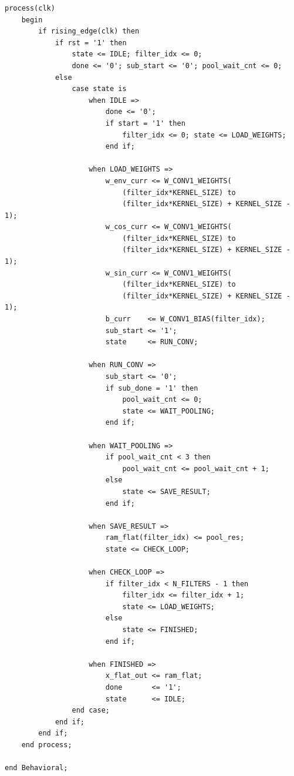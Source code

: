 \documentclass[a4paper,12pt]{article}
\begin{document}
\begin{lstlisting}[style=vhdlstyle,
    caption={C\'odigo VHDL do \texttt{Conv\_Layer\_Serial}.},
    label={lst:conv_serial}]
    process(clk)
    begin
        if rising_edge(clk) then
            if rst = '1' then
                state <= IDLE; filter_idx <= 0;
                done <= '0'; sub_start <= '0'; pool_wait_cnt <= 0;
            else
                case state is
                    when IDLE =>
                        done <= '0';
                        if start = '1' then
                            filter_idx <= 0; state <= LOAD_WEIGHTS;
                        end if;

                    when LOAD_WEIGHTS =>
                        w_env_curr <= W_CONV1_WEIGHTS(
                            (filter_idx*KERNEL_SIZE) to
                            (filter_idx*KERNEL_SIZE) + KERNEL_SIZE - 1);
                        w_cos_curr <= W_CONV1_WEIGHTS(
                            (filter_idx*KERNEL_SIZE) to
                            (filter_idx*KERNEL_SIZE) + KERNEL_SIZE - 1);
                        w_sin_curr <= W_CONV1_WEIGHTS(
                            (filter_idx*KERNEL_SIZE) to
                            (filter_idx*KERNEL_SIZE) + KERNEL_SIZE - 1);
                        b_curr    <= W_CONV1_BIAS(filter_idx);
                        sub_start <= '1';
                        state     <= RUN_CONV;

                    when RUN_CONV =>
                        sub_start <= '0';
                        if sub_done = '1' then
                            pool_wait_cnt <= 0;
                            state <= WAIT_POOLING;
                        end if;

                    when WAIT_POOLING =>
                        if pool_wait_cnt < 3 then
                            pool_wait_cnt <= pool_wait_cnt + 1;
                        else
                            state <= SAVE_RESULT;
                        end if;

                    when SAVE_RESULT =>
                        ram_flat(filter_idx) <= pool_res;
                        state <= CHECK_LOOP;

                    when CHECK_LOOP =>
                        if filter_idx < N_FILTERS - 1 then
                            filter_idx <= filter_idx + 1;
                            state <= LOAD_WEIGHTS;
                        else
                            state <= FINISHED;
                        end if;

                    when FINISHED =>
                        x_flat_out <= ram_flat;
                        done       <= '1';
                        state      <= IDLE;
                end case;
            end if;
        end if;
    end process;

end Behavioral;
\end{lstlisting}
\end{document}
